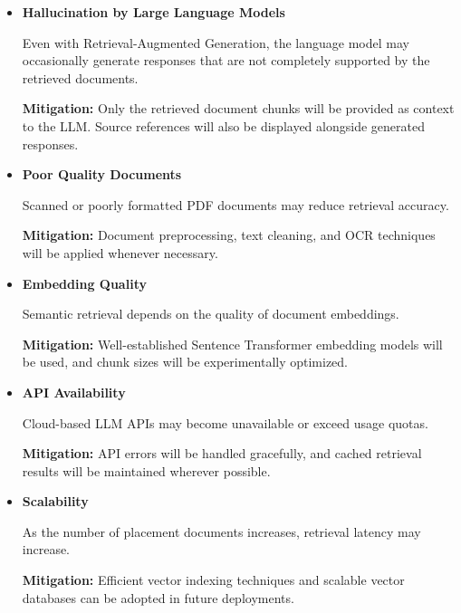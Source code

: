 \documentclass[11pt]{article}
\begin{document}
\begin{itemize}

\item \textbf{Hallucination by Large Language Models}

Even with Retrieval-Augmented Generation, the language model may occasionally generate responses that are not completely supported by the retrieved documents.

\textbf{Mitigation:}
Only the retrieved document chunks will be provided as context to the LLM. Source references will also be displayed alongside generated responses.

\vspace{0.2cm}

\item \textbf{Poor Quality Documents}

Scanned or poorly formatted PDF documents may reduce retrieval accuracy.

\textbf{Mitigation:}
Document preprocessing, text cleaning, and OCR techniques will be applied whenever necessary.

\vspace{0.2cm}

\item \textbf{Embedding Quality}

Semantic retrieval depends on the quality of document embeddings.

\textbf{Mitigation:}
Well-established Sentence Transformer embedding models will be used, and chunk sizes will be experimentally optimized.

\vspace{0.2cm}

\item \textbf{API Availability}

Cloud-based LLM APIs may become unavailable or exceed usage quotas.

\textbf{Mitigation:}
API errors will be handled gracefully, and cached retrieval results will be maintained wherever possible.

\vspace{0.2cm}

\item \textbf{Scalability}

As the number of placement documents increases, retrieval latency may increase.

\textbf{Mitigation:}
Efficient vector indexing techniques and scalable vector databases can be adopted in future deployments.

\end{itemize}
\end{document}
